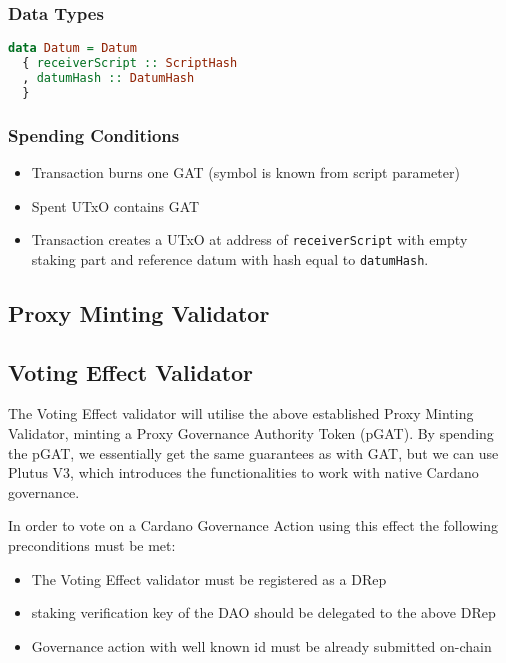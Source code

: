 \documentclass{article}
\begin{document}
\subsubsection*{Data Types}

\begin{lstlisting}[language=Haskell]
data Datum = Datum
  { receiverScript :: ScriptHash
  , datumHash :: DatumHash
  }
\end{lstlisting}

\subsubsection*{Spending Conditions}

\begin{itemize}
  \item Transaction burns one GAT (symbol is known from script parameter)
  \item Spent UTxO contains GAT
  \item Transaction creates a UTxO at address of \verb|receiverScript| with empty staking part and reference datum with hash equal to \verb|datumHash|.
\end{itemize}

\subsection{Proxy Minting Validator}

\subsection{Voting Effect Validator}

The Voting Effect validator will utilise the above established Proxy Minting Validator, minting a Proxy Governance Authority Token (pGAT).
By spending the pGAT, we essentially get the same guarantees as with GAT, but we can use Plutus V3, which introduces the functionalities to work with native Cardano governance.

In order to vote on a Cardano Governance Action using this effect the following preconditions must be met:
\begin{itemize}
  \item The Voting Effect validator must be registered as a DRep
  \item staking verification key of the DAO should be delegated to the above DRep
  \item Governance action with well known id must be already submitted on-chain
\end{itemize}
\end{document}
